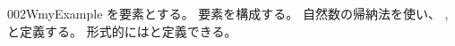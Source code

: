 \documentclass[index]{subfiles}
\begin{document}
\begin{myBlock}{002W}{myExample}
  を要素とする。
  要素を構成する。
  自然数の帰納法を使い、
  ,
  と定義する。
  形式的にはと定義できる。
\end{myBlock}
\end{document}
